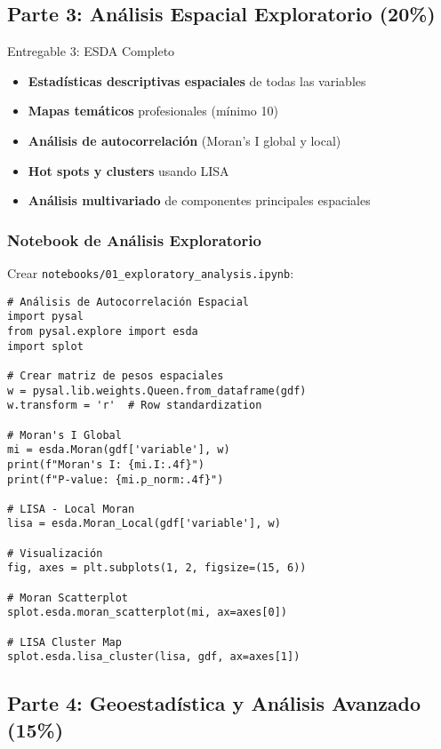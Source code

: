 \documentclass[12pt,a4paper]{article}
\begin{document}
\subsection{Parte 3: Análisis Espacial Exploratorio (20\%)}

\begin{deliverable}{Entregable 3: ESDA Completo}
\begin{itemize}
    \item \textbf{Estadísticas descriptivas espaciales} de todas las variables
    \item \textbf{Mapas temáticos} profesionales (mínimo 10)
    \item \textbf{Análisis de autocorrelación} (Moran's I global y local)
    \item \textbf{Hot spots y clusters} usando LISA
    \item \textbf{Análisis multivariado} de componentes principales espaciales
\end{itemize}
\end{deliverable}

\subsubsection{Notebook de Análisis Exploratorio}

Crear \texttt{notebooks/01\_exploratory\_analysis.ipynb}:

\begin{verbatim}
# Análisis de Autocorrelación Espacial
import pysal
from pysal.explore import esda
import splot

# Crear matriz de pesos espaciales
w = pysal.lib.weights.Queen.from_dataframe(gdf)
w.transform = 'r'  # Row standardization

# Moran's I Global
mi = esda.Moran(gdf['variable'], w)
print(f"Moran's I: {mi.I:.4f}")
print(f"P-value: {mi.p_norm:.4f}")

# LISA - Local Moran
lisa = esda.Moran_Local(gdf['variable'], w)

# Visualización
fig, axes = plt.subplots(1, 2, figsize=(15, 6))

# Moran Scatterplot
splot.esda.moran_scatterplot(mi, ax=axes[0])

# LISA Cluster Map
splot.esda.lisa_cluster(lisa, gdf, ax=axes[1])
\end{verbatim}

\subsection{Parte 4: Geoestadística y Análisis Avanzado (15\%)}
\end{document}
